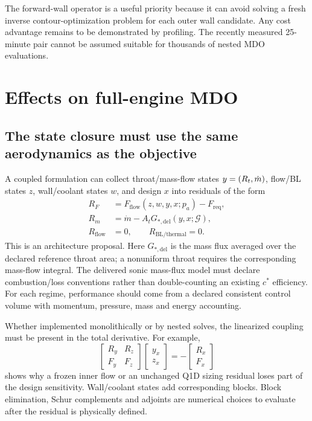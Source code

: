 The forward-wall operator is a useful priority because it can avoid
solving a fresh inverse contour-optimization problem for each outer wall
candidate. Any cost advantage remains to be demonstrated by profiling.
The recently measured 25-minute pair cannot be assumed suitable for
thousands of nested MDO evaluations.

\section{Effects on full-engine MDO}
\label{sec:mdo}
\subsection{The state closure must use the same aerodynamics as the objective}
\proposal A coupled formulation can collect throat/mass-flow states
\(y=(R_t,\dot m)\), flow/BL states \(z\), wall/coolant states \(w\), and
design \(x\) into residuals of the form
\begin{align}
R_F&=F_{\mathrm{flow}}(z,w,y,x;p_a)-F_{\mathrm{req}},\\
R_m&=\dot m-A_tG_{*,\mathrm{del}}(y,x;\mathcal G),\\
R_{\mathrm{flow}}&=0,\qquad
R_{\mathrm{BL/thermal}}=0.
\end{align}
This is an architecture proposal. Here \(G_{*,\mathrm{del}}\) is the
mass flux averaged over the declared reference throat area; a
nonuniform throat requires the corresponding mass-flow integral.
The delivered sonic mass-flux model
must declare combustion/loss conventions rather than double-counting
an existing \(c^*\) efficiency. For each regime, performance should come
from a declared consistent control volume with momentum, pressure,
mass and energy accounting.

Whether implemented monolithically or by nested solves, the linearized
coupling must be present in the total derivative. For example,
\begin{equation}
\begin{bmatrix}
R_y & R_z\\ F_y & F_z
\end{bmatrix}
\begin{bmatrix}y_x\\ z_x\end{bmatrix}
=-
\begin{bmatrix}R_x\\F_x\end{bmatrix}
\end{equation}
shows why a frozen inner flow or an unchanged Q1D sizing residual loses
part of the design sensitivity. Wall/coolant states add corresponding
blocks. Block elimination, Schur complements and adjoints are numerical
choices to evaluate after the residual is physically defined.

